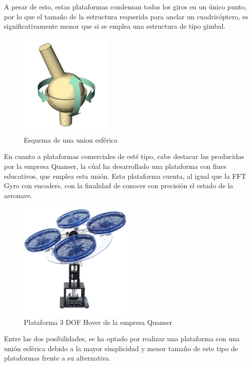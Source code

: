 A pesar de esto, estas plataformas condensan todos los giros en un único punto, por lo que el tamaño de la estructura requerida para anclar un cuadricóptero, es significativamente menor  que si se emplea una estructura de tipo gimbal.

\begin{figure}[htb!]
	\centering
	\includegraphics[width=0.4\textwidth]{estadodelarte/union_esferica}
	\caption{Esquema de una union esférica}
	\label{union esferica}
\end{figure}
\newpage
En cuanto a plataformas comerciales de esté tipo, cabe destacar las producidas por la empresa Quanser, la cúal ha desarrollado una plataforma con fines educativos, que emplea esta unión. Esta plataforma cuenta, al igual que la FFT Gyro con encoders, con la finalidad de conocer con precisión el estado de la aeronave.
   
\begin{figure}[htb!]
	\centering
	\includegraphics[width=0.5\textwidth]{estadodelarte/quanser}
	\caption{Plataforma 3 DOF Hover de la empresa Quanser}
	\label{union esferica}
\end{figure}

Entre las dos posibilidades, se ha optado por realizar una plataforma con una unión esférica debido a la mayor simplicidad y menor tamaño de este tipo de plataformas frente a su alternativa.
